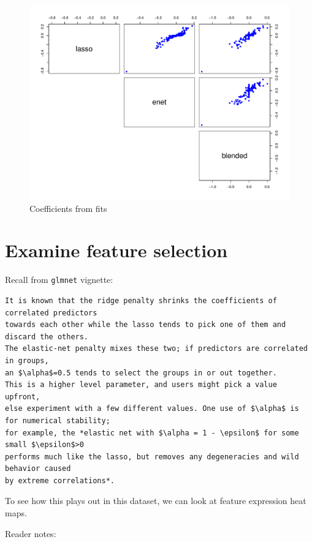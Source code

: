 \documentclass[
]{book}
\begin{document}
\begin{figure}
\centering
\includegraphics{Static/figures/brcaRna-glmnetFit-pairsCoeffProf-1.pdf}
\caption{\label{fig:brcaRna-glmnetFit-pairsCoeffProf}Coefficients from fits}
\end{figure}

\hypertarget{examine-feature-selection-1}{%
\section{Examine feature selection}\label{examine-feature-selection-1}}

Recall from \texttt{glmnet} vignette:

\begin{verbatim}
It is known that the ridge penalty shrinks the coefficients of correlated predictors
towards each other while the lasso tends to pick one of them and discard the others.
The elastic-net penalty mixes these two; if predictors are correlated in groups,
an $\alpha$=0.5 tends to select the groups in or out together.
This is a higher level parameter, and users might pick a value upfront,
else experiment with a few different values. One use of $\alpha$ is for numerical stability;
for example, the *elastic net with $\alpha = 1 - \epsilon$ for some small $\epsilon$>0
performs much like the lasso, but removes any degeneracies and wild behavior caused
by extreme correlations*.
\end{verbatim}

To see how this plays out in this dataset, we can look at feature expression
heat maps.

Reader notes:
\end{document}
